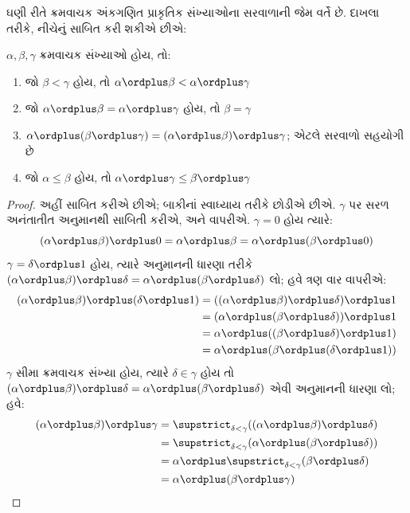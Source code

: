 \documentclass[../../../include/open-logic-section]{subfiles}
\begin{document}
ઘણી રીતે ક્રમવાચક અંકગણિત પ્રાકૃતિક સંખ્યાઓના
સરવાળાની જેમ વર્તે છે. દાખલા તરીકે, નીચેનું સાબિત
કરી શકીએ છીએ:

\begin{lem}
$\alpha, \beta, \gamma$ ક્રમવાચક સંખ્યાઓ હોય, તો:
\begin{enumerate}
	\item{} જો $\beta < \gamma$ હોય, તો $\alpha
	\ordplus  \beta < \alpha \ordplus  \gamma$
	\item{} જો $\alpha \ordplus  \beta =
	\alpha\ordplus \gamma$ હોય, તો $\beta = \gamma$
	\item{} $\alpha \ordplus  (\beta \ordplus
	\gamma) = (\alpha \ordplus  \beta) \ordplus  \gamma$;
	એટલે સરવાળો સહયોગી છે
	\item{} જો $\alpha \leq \beta$ હોય, તો $\alpha
	\ordplus  \gamma \leq \beta \ordplus \gamma$
\end{enumerate}
\end{lem}

\begin{proof}
અહીં  સાબિત કરીએ છીએ; બાકીનાં
સ્વાધ્યાય તરીકે છોડીએ છીએ. $\gamma$ પર સરળ
અનંતાતીત અનુમાનથી સાબિતી કરીએ, અને
 વાપરીએ. $\gamma = 0$
હોય ત્યારે:
\[
(\alpha \ordplus  \beta) \ordplus  0 = \alpha \ordplus  \beta  = \alpha \ordplus  (\beta \ordplus  0)
\]
$\gamma = \delta\ordplus 1$ હોય, ત્યારે અનુમાનની
ધારણા તરીકે $(\alpha
\ordplus  \beta) \ordplus  \delta = \alpha \ordplus  (\beta \ordplus
\delta)$ લો; હવે  ત્રણ વાર વાપરીએ:
\begin{align*}
	(\alpha \ordplus  \beta) \ordplus  (\delta \ordplus  1) & = ((\alpha \ordplus  \beta) \ordplus  \delta)\ordplus 1\\
	& = (\alpha \ordplus  (\beta \ordplus  \delta)) \ordplus  1\\
	& = \alpha \ordplus  ((\beta \ordplus  \delta)\ordplus 1)\\
	& = \alpha \ordplus  (\beta \ordplus  (\delta\ordplus 1))
\end{align*}
$\gamma$ સીમા ક્રમવાચક સંખ્યા હોય, ત્યારે
$\delta \in \gamma$ હોય તો $(\alpha \ordplus  \beta) \ordplus  \delta =
\alpha \ordplus  (\beta \ordplus  \delta)$ એવી
અનુમાનની ધારણા લો; હવે:
\begin{align*}
	(\alpha \ordplus  \beta) \ordplus  \gamma & = \supstrict_{\delta < \gamma}((\alpha \ordplus  \beta) \ordplus  \delta) \\
	&= \supstrict_{\delta < \gamma}(\alpha \ordplus  (\beta \ordplus  \delta))\\
	&= \alpha \ordplus  \supstrict_{\delta < \gamma}(\beta \ordplus  \delta)\\
	& = \alpha \ordplus  (\beta \ordplus  \gamma)
\end{align*}
\end{proof}
\end{document}
